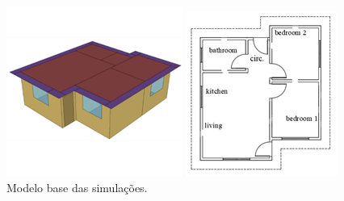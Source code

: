 \documentclass{article}
\begin{document}
\begin{figure}[h]
	\caption{Modelo base das simulações.} %
	\label{fig:modelo}
	\centering
	\begin{minipage}{.5\textwidth}
		\centering
		\includegraphics[width=\linewidth]{modelo_casinha.png}
	\end{minipage}%
	\begin{minipage}{.3\textwidth}
		\centering
		\includegraphics[width=\linewidth]{planta_casinha.png}
	\end{minipage}%
\end{figure}
\end{document}
